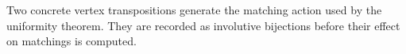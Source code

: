 \documentclass[11pt]{article}
\begin{document}
Two concrete vertex transpositions generate the matching action used by the
uniformity theorem.  They are recorded as involutive bijections before their
effect on matchings is computed.

\begin{code}%
\>[0]\<%
\\
\>[0]\AgdaSpace{}%
\AgdaSymbol{:}\AgdaSpace{}%
\AgdaSpace{}%
\AgdaSpace{}%
\<%
\\
\>[0]\AgdaSpace{}%
\AgdaSpace{}%
\AgdaSymbol{=}\AgdaSpace{}%
\<%
\\
\>[0]\AgdaSpace{}%
\AgdaSpace{}%
\AgdaSymbol{=}\AgdaSpace{}%
\<%
\\
\>[0]\AgdaSpace{}%
\AgdaSpace{}%
\AgdaSymbol{=}\AgdaSpace{}%
\<%
\\
\>[0]\AgdaSpace{}%
\AgdaSpace{}%
\AgdaSymbol{=}\AgdaSpace{}%
\<%
\\
%
\\[\AgdaEmptyExtraSkip]%
\>[0]\AgdaSpace{}%
\AgdaSymbol{:}\AgdaSpace{}%
\AgdaSpace{}%
\AgdaSpace{}%
\<%
\\
\>[0]\AgdaSpace{}%
\AgdaSpace{}%
\AgdaSymbol{=}\AgdaSpace{}%
\<%
\\
\>[0]\AgdaSpace{}%
\AgdaSpace{}%
\AgdaSymbol{=}\AgdaSpace{}%
\<%
\\
\>[0]\AgdaSpace{}%
\AgdaSpace{}%
\AgdaSymbol{=}\AgdaSpace{}%
\<%
\\
\>[0]\AgdaSpace{}%
\AgdaSpace{}%
\AgdaSymbol{=}\AgdaSpace{}%
\<%
\\
%
\\[\AgdaEmptyExtraSkip]%
\>[0]\AgdaSpace{}%
\AgdaSymbol{:}\<%
\\
\>[0][@{}l@{\AgdaIndent{0}}]%
\>[2]\AgdaSymbol{(}\AgdaSpace{}%

\end{code}
\end{document}
